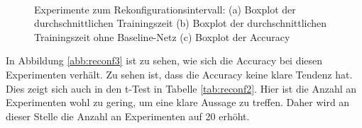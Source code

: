\begin{figure}
     \centering
     \hfill
     \\
     \caption{Experimente zum Rekonfigurationsintervall: (a) Boxplot der durchschnittlichen Trainingszeit (b) Boxplot der durchschnittlichen Trainingszeit ohne Baseline-Netz (c) Boxplot der Accuracy}
     \label{abb:reconf}
\end{figure}

In Abbildung \ref{abb:reconf3} ist zu sehen, wie sich die Accuracy bei diesen Experimenten verhält. Zu sehen ist, dass die Accuracy keine klare Tendenz hat. Dies zeigt sich auch in den t-Test in Tabelle \ref{tab:reconf2}. Hier ist die Anzahl an Experimenten wohl zu gering, um eine klare Aussage zu treffen. Daher wird an dieser Stelle die Anzahl an Experimenten auf 20 erhöht. 



